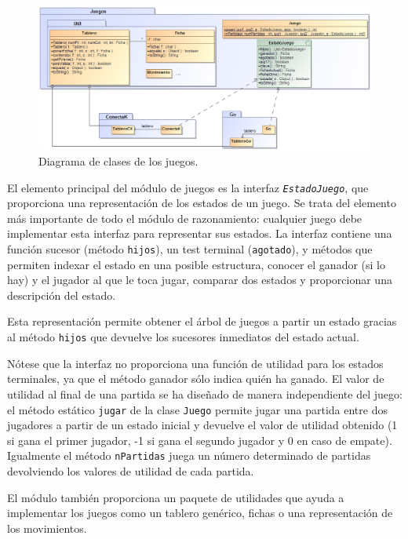 \begin{figure}[!p]
	\centering
	\includegraphics[scale=0.5,angle=90]{contenido/cap6/imagenes/diagramaclases_juegos.eps}
	\caption{Diagrama de clases de los juegos.}
	\label{fig:diagramaclases_juegos}
\end{figure}

El elemento principal del módulo de juegos es la interfaz \texttt{\textit{EstadoJuego}}, que proporciona una representación de los estados de un juego.
Se trata del elemento más importante de todo el módulo de razonamiento: cualquier juego debe implementar esta interfaz para representar sus estados.
La interfaz contiene una función sucesor (método \texttt{hijos}), un test terminal (\texttt{agotado}), y métodos que permiten indexar el estado en una posible estructura, conocer el ganador (si lo hay) y el jugador al que le toca jugar, comparar dos estados y proporcionar una descripción del estado.

Esta representación permite obtener el árbol de juegos a partir un estado gracias al método \texttt{hijos} que devuelve los sucesores inmediatos del estado actual.

Nótese que la interfaz no proporciona una función de utilidad para los estados terminales, ya que el método ganador sólo indica quién ha ganado.
El valor de utilidad al final de una partida se ha diseñado de manera independiente del juego: el método estático \texttt{jugar} de la clase \texttt{Juego} permite jugar una partida entre dos jugadores a partir de un estado inicial y devuelve el valor de utilidad obtenido (1 si gana el primer jugador, -1 si gana el segundo jugador y 0 en caso de empate).
Igualmente el método \texttt{nPartidas} juega un número determinado de partidas devolviendo los valores de utilidad de cada partida.

El módulo también proporciona un paquete de utilidades que ayuda a implementar los juegos como un tablero genérico, fichas o una representación de los movimientos.

